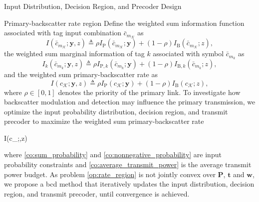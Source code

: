 \documentclass[journal]{IEEEtran}
\begin{document}
	\begin{section}{Input Distribution, Decision Region, and Precoder Design}
		\begin{subsection}{Primary-backscatter rate region}
			Define the weighted sum information function associated with tag input combination $\bar{c}_{m_{\mathcal{K}}}$ as
			\begin{equation}
				I(\bar{c}_{m_{\mathcal{K}}};\boldsymbol{y},z) \triangleq \rho I_{\mathrm{P}}(\bar{c}_{m_{\mathcal{K}}};\boldsymbol{y}) + (1 - \rho) I_{\mathrm{B}}(\bar{c}_{m_{\mathcal{K}}};z),
				\label{eq:weighted_sum_information_function}
			\end{equation}
			the weighted sum marginal information of tag $k$ associated with symbol $\bar{c}_{m_k}$ as
			\begin{equation}
				I_k(\bar{c}_{m_k};\boldsymbol{y},z) \triangleq \rho I_{\mathrm{P},k}(\bar{c}_{m_k};\boldsymbol{y}) + (1 - \rho) I_{\mathrm{B},k}(\bar{c}_{m_k};z),
				\label{eq:weighted_sum_marginal_information}
			\end{equation}
			and the weighted sum primary-backscatter rate as
			\begin{equation}
				I(c_{\mathcal{K}};\boldsymbol{y},z) \triangleq \rho I_{\mathrm{P}}(c_{\mathcal{K}};\boldsymbol{y}) + (1 - \rho) I_{\mathrm{B}}(c_{\mathcal{K}};z),
				\label{eq:weighted_sum_rate}
			\end{equation}
			where $\rho \in [0,1]$ denotes the priority of the primary link. To investigate how backscatter modulation and detection may influence the primary transmission, we optimize the input probability distribution, decision region, and transmit precoder to maximize the weighted sum primary-backscatter rate
			\begin{maxi!}
				{}{I(c_{};,z)}{\label{op:rate_region}}{\label{ob:weighted_sum_rate}}
			\end{maxi!}
			where \eqref{co:sum_probability} and \eqref{co:nonnegative_probability} are input probability constraints and \eqref{co:average_transmit_power} is the average transmit power budget. As problem \eqref{op:rate_region} is not jointly convex over $\boldsymbol{P}$, $\boldsymbol{t}$ and $\boldsymbol{w}$, we propose a \gls{bcd} method that iteratively updates the input distribution, decision region, and transmit precoder, until convergence is achieved.
		\end{subsection}


\end{section}
\end{document}
